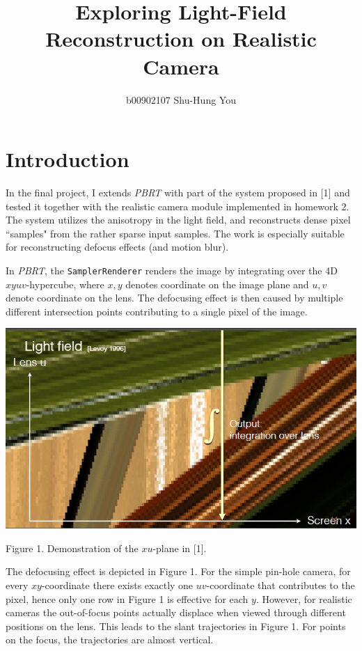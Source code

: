 \documentclass{article}
\begin{document}
\title{Exploring Light-Field Reconstruction on Realistic Camera}
\author{b00902107 Shu-Hung You}
\date{}
\maketitle
\section{Introduction}
In the final project, I extends \textit{PBRT} with part of the system proposed in [1] and tested it together with the realistic camera module implemented in homework 2. The system utilizes the anisotropy in the light field, and reconstructs dense pixel ``samples" from the rather sparse input samples. The work is especially suitable for reconstructing defocus effects (and motion blur).

In \textit{PBRT}, the \texttt{SamplerRenderer} renders the image by integrating over the 4D $xyuv$-hypercube, where $x,y$ denotes coordinate on the image plane and $u,v$ denote coordinate on the lens. The defocusing effect is then caused by multiple different intersection points contributing to a single pixel of the image.

\begin{center}
  \includegraphics[scale=0.8]{./xu-plane.jpg}

  \small{Figure 1. Demonstration of the $xu$-plane in [1].}
\end{center}

The defocusing effect is depicted in Figure 1. For the simple pin-hole camera, for every $xy$-coordinate there exists exactly one $uv$-coordinate that contributes to the pixel, hence only one row in Figure 1 is effective for each $y$. However, for realistic cameras the out-of-focus points actually displace when viewed through different positions on the lens. This leads to the slant trajectories in Figure 1. For points on the focus, the trajectories are almost vertical.
\end{document}
